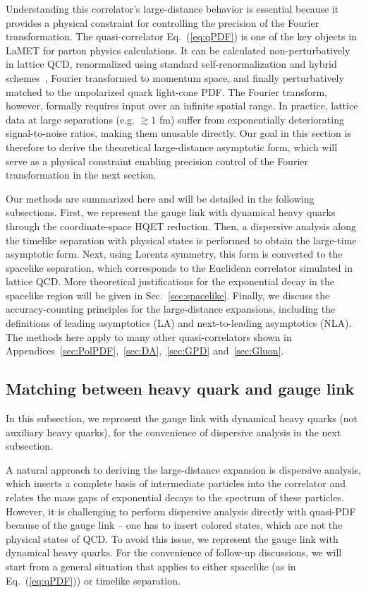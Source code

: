 \documentclass[a4paper,11pt]{article}
\begin{document}
Understanding this correlator’s large-distance behavior is essential because it provides a physical constraint for controlling the precision of the Fourier transformation. The quasi-correlator Eq.~(\ref{eq:qPDF}) is one of the key objects in LaMET for parton physics calculations. It can be calculated non-perturbatively in lattice QCD, renormalized using standard self-renormalization and hybrid schemes~\cite{Ji:2020brr,LatticePartonLPC:2021gpi}, Fourier transformed to momentum space, and finally perturbatively matched to the unpolarized quark light-cone PDF. The Fourier transform, however, formally requires input over an infinite spatial range. In practice, lattice data at large separations (e.g. $\gtrsim 1$ fm) suffer from exponentially deteriorating signal-to-noise ratios, making them unusable directly. Our goal in this section is therefore to derive the theoretical large-distance asymptotic form, which will serve as a physical constraint enabling precision control of the Fourier transformation in the next section.

Our methods are summarized here and will be detailed in the following subsections. First, we represent the gauge link with dynamical heavy quarks through the coordinate-space HQET reduction. Then, a dispersive analysis along the timelike separation with physical states is performed to obtain the large-time asymptotic form. Next, using Lorentz symmetry, this form is converted to the spacelike separation, which corresponds to the Euclidean correlator simulated in lattice QCD. More theoretical justifications for the exponential decay in the spacelike region will be given in Sec.~\ref{sec:spacelike}. Finally, we discuss the accuracy-counting principles for the large-distance expansions, including the definitions of leading asymptotics (LA) and next-to-leading asymptotics (NLA). The methods here apply to many other quasi-correlators shown in Appendices~\ref{sec:PolPDF},~\ref{sec:DA},~\ref{sec:GPD} and~\ref{sec:Gluon}. 


\subsection{Matching between heavy quark and gauge link}\label{sec:HQETred}
In this subsection, we represent the gauge link with dynamical heavy quarks (not auxiliary heavy quarks), for the convenience of dispersive analysis in the next subsection. 

A natural approach to deriving the large-distance expansion is dispersive analysis, which inserts a complete basis of intermediate particles into the correlator and relates the mass gaps of exponential decays to the spectrum of these particles. However, it is challenging to perform dispersive analysis directly with quasi-PDF because of the gauge link -- one has to insert colored states, which are not the physical states of QCD. To avoid this issue, we represent the gauge link with dynamical heavy quarks. For the convenience of follow-up discussions, we will start from a general situation that applies to either spacelike (as in Eq.~(\ref{eq:qPDF})) or timelike separation. 
\end{document}
